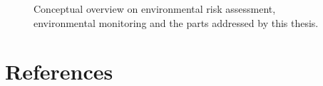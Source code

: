 \begin{figure}[h]
	\vspace{2em}
    \hspace*{-1cm} 
	\resizebox{1.05\textwidth}{!}{%
		
	}
	\caption[Conceptual overview of the topics addressed by this thesis]{Conceptual overview on environmental risk assessment, environmental monitoring and the parts addressed by this thesis.}
	\label{fig:intro:overview}
\end{figure}



\clearpage
\section{References}
\printbibliography[heading=none]
